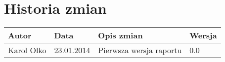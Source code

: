 \section{Historia zmian}
\begin{tabular}{ |C{0.15\textwidth}|C{0.15\textwidth}|C{0.55\textwidth}|C{0.15\textwidth}| }
\hline Autor & Data & Opis zmian & Wersja \\ 
\hline Karol Olko & 23.01.2014 & Pierwsza wersja raportu & 0.0 \\ 
\hline 
\end{tabular} 